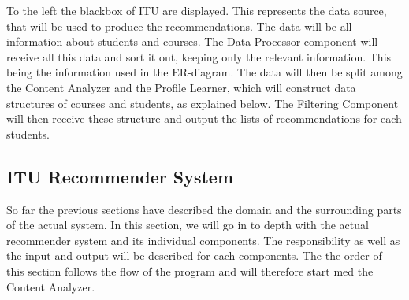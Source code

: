 To the left the blackbox of ITU are displayed. This represents the data source, that will be used to produce the recommendations. The data will be all information about students and courses. The Data Processor component will receive all this data and sort it out, keeping only the relevant information. This being the information used in the ER-diagram. The data will then be split among the Content Analyzer and the Profile Learner, which will construct data structures of courses and students, as explained below. The Filtering Component will then receive these structure and output the lists of recommendations for each students. 


\subsection{ITU Recommender System}
So far the previous sections have described the domain and the surrounding parts of the actual system. In this section, we will go in to depth with the actual recommender system and its individual components. The responsibility as well as the input and output will be described for each components. The the order of this section follows the flow of the program and will therefore start med the Content Analyzer.
